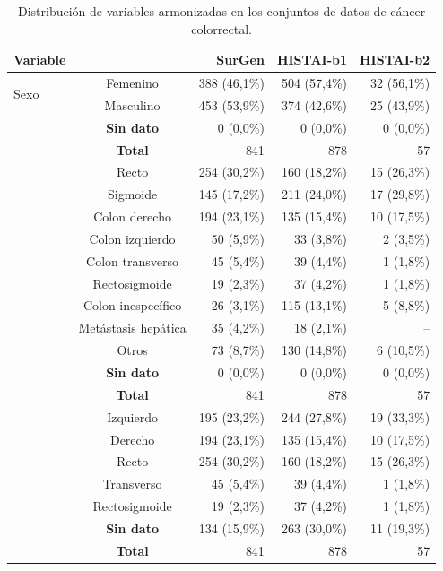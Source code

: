 \begin{table}[htbp]
\centering
\caption{Distribución de variables armonizadas en los conjuntos de datos de cáncer colorrectal.}
\label{tab:frecuencias_colorrectal}
\small
\begin{tabular}{lcrrr}
\toprule
Variable & & SurGen & HISTAI-b1 & HISTAI-b2 \\
\midrule
\multirow{2}{*}{Sexo}
 & Femenino & 388 (46,1\%) & 504 (57,4\%) & 32 (56,1\%) \\
 & Masculino & 453 (53,9\%) & 374 (42,6\%) & 25 (43,9\%) \\
 & \textbf{Sin dato} & 0 (0,0\%) & 0 (0,0\%) & 0 (0,0\%) \\
 & \textbf{Total} & 841 & 878 & 57 \\
\addlinespace
\multirow{9}{*}{Sitio}
 & Recto & 254 (30,2\%) & 160 (18,2\%) & 15 (26,3\%) \\
 & Sigmoide & 145 (17,2\%) & 211 (24,0\%) & 17 (29,8\%) \\
 & Colon derecho & 194 (23,1\%) & 135 (15,4\%) & 10 (17,5\%) \\
 & Colon izquierdo & 50 (5,9\%) & 33 (3,8\%) & 2 (3,5\%) \\
 & Colon transverso & 45 (5,4\%) & 39 (4,4\%) & 1 (1,8\%) \\
 & Rectosigmoide & 19 (2,3\%) & 37 (4,2\%) & 1 (1,8\%) \\
 & Colon inespecífico & 26 (3,1\%) & 115 (13,1\%) & 5 (8,8\%) \\
 & Metástasis hepática & 35 (4,2\%) & 18 (2,1\%) & -- \\
 & Otros & 73 (8,7\%) & 130 (14,8\%) & 6 (10,5\%) \\
 & \textbf{Sin dato} & 0 (0,0\%) & 0 (0,0\%) & 0 (0,0\%) \\
 & \textbf{Total} & 841 & 878 & 57 \\
\addlinespace
\multirow{5}{*}{Lateralidad}
 & Izquierdo & 195 (23,2\%) & 244 (27,8\%) & 19 (33,3\%) \\
 & Derecho & 194 (23,1\%) & 135 (15,4\%) & 10 (17,5\%) \\
 & Recto & 254 (30,2\%) & 160 (18,2\%) & 15 (26,3\%) \\
 & Transverso & 45 (5,4\%) & 39 (4,4\%) & 1 (1,8\%) \\
 & Rectosigmoide & 19 (2,3\%) & 37 (4,2\%) & 1 (1,8\%) \\
 & \textbf{Sin dato} & 134 (15,9\%) & 263 (30,0\%) & 11 (19,3\%) \\
 & \textbf{Total} & 841 & 878 & 57 \\
\bottomrule
\end{tabular}
\end{table}